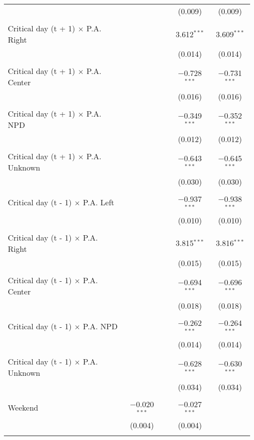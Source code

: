 \documentclass[
]{article}
\begin{document}
\begin{table}[!htbp]
{\begin{tabular}{@{\extracolsep{5pt}}lcccc}
  &  &  & (0.009) & (0.009) \\ 
  & & & & \\ 
 Critical day (t + 1) $\times$ P.A. Right &  &  & 3.612$^{***}$ & 3.609$^{***}$ \\ 
  &  &  & (0.014) & (0.014) \\ 
  & & & & \\ 
 Critical day (t + 1) $\times$ P.A. Center &  &  & $-$0.728$^{***}$ & $-$0.731$^{***}$ \\ 
  &  &  & (0.016) & (0.016) \\ 
  & & & & \\ 
 Critical day (t + 1) $\times$ P.A. NPD &  &  & $-$0.349$^{***}$ & $-$0.352$^{***}$ \\ 
  &  &  & (0.012) & (0.012) \\ 
  & & & & \\ 
 Critical day (t + 1) $\times$ P.A. Unknown &  &  & $-$0.643$^{***}$ & $-$0.645$^{***}$ \\ 
  &  &  & (0.030) & (0.030) \\ 
  & & & & \\ 
 Critical day (t - 1) $\times$ P.A. Left &  &  & $-$0.937$^{***}$ & $-$0.938$^{***}$ \\ 
  &  &  & (0.010) & (0.010) \\ 
  & & & & \\ 
 Critical day (t - 1) $\times$ P.A. Right &  &  & 3.815$^{***}$ & 3.816$^{***}$ \\ 
  &  &  & (0.015) & (0.015) \\ 
  & & & & \\ 
 Critical day (t - 1) $\times$ P.A. Center &  &  & $-$0.694$^{***}$ & $-$0.696$^{***}$ \\ 
  &  &  & (0.018) & (0.018) \\ 
  & & & & \\ 
 Critical day (t - 1) $\times$ P.A. NPD &  &  & $-$0.262$^{***}$ & $-$0.264$^{***}$ \\ 
  &  &  & (0.014) & (0.014) \\ 
  & & & & \\ 
 Critical day (t - 1) $\times$ P.A. Unknown &  &  & $-$0.628$^{***}$ & $-$0.630$^{***}$ \\ 
  &  &  & (0.034) & (0.034) \\ 
  & & & & \\ 
 Weekend & $-$0.020$^{***}$ &  & $-$0.027$^{***}$ &  \\ 
  & (0.004) &  & (0.004) &  \\ 
  & & & & \\ 

\end{tabular}}
\end{table}
\end{document}
